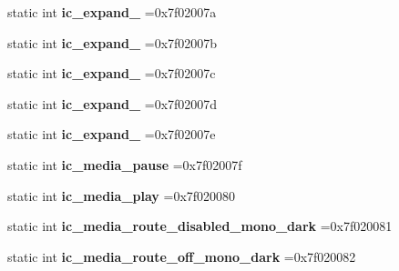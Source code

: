 \begin{DoxyCompactItemize}
static int {\bfseries ic\+\_\+expand\+\_} =0x7f02007a
\item 
\mbox{\label{classandroid_1_1support_1_1design_1_1R_1_1drawable_a89664bfc7f7be105f8c58e69ab82c3e8}} 
static int {\bfseries ic\+\_\+expand\+\_} =0x7f02007b
\item 
\mbox{\label{classandroid_1_1support_1_1design_1_1R_1_1drawable_aa123ae28bdc16e35974080e63de7b7df}} 
static int {\bfseries ic\+\_\+expand\+\_} =0x7f02007c
\item 
\mbox{\label{classandroid_1_1support_1_1design_1_1R_1_1drawable_afb61cff4afba4a688d96ec8a9ec1ad8a}} 
static int {\bfseries ic\+\_\+expand\+\_} =0x7f02007d
\item 
\mbox{\label{classandroid_1_1support_1_1design_1_1R_1_1drawable_aec3da0643f03b7f21e639c702ab55542}} 
static int {\bfseries ic\+\_\+expand\+\_} =0x7f02007e
\item 
\mbox{\label{classandroid_1_1support_1_1design_1_1R_1_1drawable_a62f0f1b6891a413cce6b8645190f41af}} 
static int {\bfseries ic\+\_\+media\+\_\+pause} =0x7f02007f
\item 
\mbox{\label{classandroid_1_1support_1_1design_1_1R_1_1drawable_a869fa7d96892fac865d27efef182c7e9}} 
static int {\bfseries ic\+\_\+media\+\_\+play} =0x7f020080
\item 
\mbox{\label{classandroid_1_1support_1_1design_1_1R_1_1drawable_a6cfe819de9ca8c8ad8bd4e33b04fe87d}} 
static int {\bfseries ic\+\_\+media\+\_\+route\+\_\+disabled\+\_\+mono\+\_\+dark} =0x7f020081
\item 
\mbox{\label{classandroid_1_1support_1_1design_1_1R_1_1drawable_a15d6566d4b48bea565e0917a1ce7e85f}} 
static int {\bfseries ic\+\_\+media\+\_\+route\+\_\+off\+\_\+mono\+\_\+dark} =0x7f020082
\item 

\end{DoxyCompactItemize}
